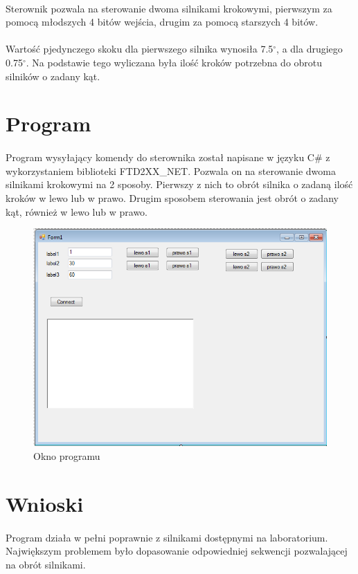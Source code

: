 \documentclass[wide,a4paper,titlepage,12pt] {article}
\begin{document}
\paragraph{}
Sterownik pozwala na sterowanie dwoma silnikami krokowymi, pierwszym za pomocą młodszych 4 bitów wejścia, drugim za pomocą starszych 4 bitów.

\paragraph{}
Wartość pjedynczego skoku dla pierwszego silnika wynosiła 7.5$^\circ$, a dla drugiego 0.75$^\circ$.
Na podstawie tego wyliczana była ilość kroków potrzebna do obrotu silników o zadany kąt.


\section{Program}
\paragraph{}
Program wysyłający komendy do sterownika został napisane w języku C\# z wykorzystaniem biblioteki FTD2XX\_NET.
Pozwala on na sterowanie dwoma silnikami krokowymi na 2 sposoby. Pierwszy z nich to obrót silnika o zadaną ilość kroków w lewo lub w prawo.
Drugim sposobem sterowania jest obrót o zadany kąt, również w lewo lub w prawo.

\begin{figure}[htbp]
  \begin{center}
    \includegraphics[width=\textwidth]{screen.png}
    \caption{Okno programu}
  \end{center}
\end{figure}


\section{Wnioski}
\paragraph{}
Program działa w pełni poprawnie z silnikami dostępnymi na laboratorium.
Największym problemem było dopasowanie odpowiedniej sekwencji pozwalającej na obrót silnikami.
\end{document}
